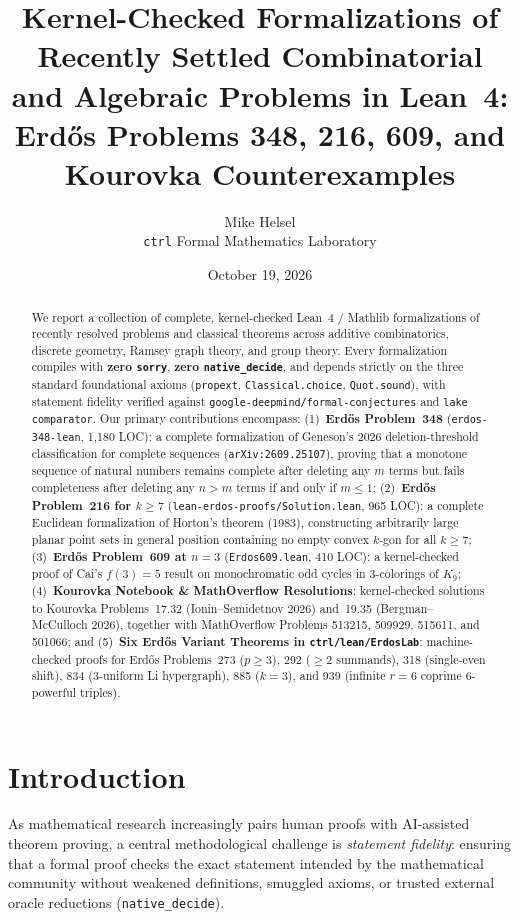 \documentclass[10pt,twocolumn]{article}
\title{\textbf{Kernel-Checked Formalizations of Recently Settled Combinatorial\\
and Algebraic Problems in Lean~4:\\
Erd\H{o}s Problems 348, 216, 609, and Kourovka Counterexamples}}
\author{Mike Helsel\\
\small \texttt{ctrl} Formal Mathematics Laboratory}
\date{October 19, 2026}
\theoremstyle{definition}
\begin{document}
\maketitle

\begin{abstract}
We report a collection of complete, kernel-checked Lean~4 / Mathlib formalizations of recently resolved problems and classical theorems across additive combinatorics, discrete geometry, Ramsey graph theory, and group theory. Every formalization compiles with \textbf{zero \texttt{sorry}}, \textbf{zero \texttt{native\_decide}}, and depends strictly on the three standard foundational axioms (\texttt{propext}, \texttt{Classical.choice}, \texttt{Quot.sound}), with statement fidelity verified against \texttt{google-deepmind/formal-conjectures} and \texttt{lake comparator}. Our primary contributions encompass:
(1)~\textbf{Erd\H{o}s Problem~348} (\texttt{erdos-348-lean}, 1,180 LOC): a complete formalization of Geneson's 2026 deletion-threshold classification for complete sequences (\texttt{arXiv:2609.25107}), proving that a monotone sequence of natural numbers remains complete after deleting any $m$ terms but fails completeness after deleting any $n > m$ terms if and only if $m \le 1$;
(2)~\textbf{Erd\H{o}s Problem~216 for $k \ge 7$} (\texttt{lean-erdos-proofs/Solution.lean}, 965 LOC): a complete Euclidean formalization of Horton's theorem (1983), constructing arbitrarily large planar point sets in general position containing no empty convex $k$-gon for all $k \ge 7$;
(3)~\textbf{Erd\H{o}s Problem~609 at $n=3$} (\texttt{Erdos609.lean}, 410 LOC): a kernel-checked proof of Cai's $f(3)=5$ result on monochromatic odd cycles in 3-colorings of $K_9$;
(4)~\textbf{Kourovka Notebook \& MathOverflow Resolutions}: kernel-checked solutions to Kourovka Problems~17.32 (Ionin--Semidetnov 2026) and~19.35 (Bergman--McCulloch 2026), together with MathOverflow Problems 513215, 509929, 515611, and 501066; and
(5)~\textbf{Six Erd\H{o}s Variant Theorems in \texttt{ctrl/lean/ErdosLab}}: machine-checked proofs for Erd\H{o}s Problems~273 ($p \ge 3$), 292 ($\ge 2$ summands), 318 (single-even shift), 834 (3-uniform Li hypergraph), 885 ($k=3$), and 939 (infinite $r=6$ coprime 6-powerful triples).
\end{abstract}

\section{Introduction}

As mathematical research increasingly pairs human proofs with AI-assisted theorem proving, a central methodological challenge is \emph{statement fidelity}: ensuring that a formal proof checks the exact statement intended by the mathematical community without weakened definitions, smuggled axioms, or trusted external oracle reductions (\texttt{native\_decide}).
\end{document}
